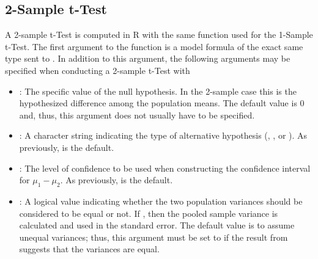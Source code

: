 \documentclass[10pt,openany]{book}\usepackage[]{graphicx}\usepackage[]{color}
\begin{document}
\subsection{2-Sample t-Test}
A 2-sample t-Test is computed in R with the same  function used for the 1-Sample t-Test.  The first argument to the  function is a model formula of the exact same type sent to .  In addition to this argument, the following arguments may be specified when conducting a 2-sample t-Test with 
\begin{itemize}
  \item {}: The specific value of the null hypothesis.  In the 2-sample case this is the hypothesized difference among the population means.  The default value is $0$ and, thus, this argument does not usually have to be specified.
  \item {}: A character string indicating the type of alternative hypothesis (, , or ).  As previously,  is the default.
  \item {}: The level of confidence to be used when constructing the confidence interval for $\mu_{1}-\mu_{2}$.  As previously,  is the default.
  \item {}: A logical value indicating whether the two population variances should be considered to be equal or not.  If , then the pooled sample variance is calculated and used in the standard error.  The default value is to assume unequal variances; thus, this argument must be set to  if the result from  suggests that the variances are equal.
\end{itemize}

\end{document}
